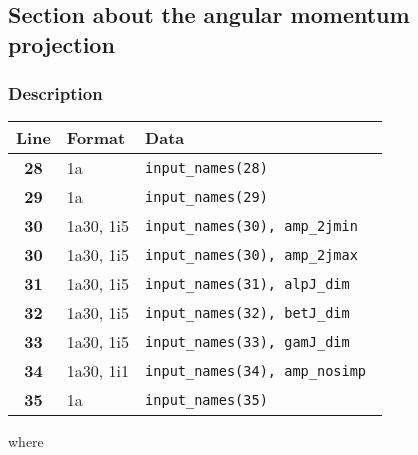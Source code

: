 \documentclass[a4paper,11pt]{article}
\begin{document}
%
%
\subsection{Section about the angular momentum projection}

\subsubsection*{Description}
\begin{center}
\begin{tabular}{|c|l|l|}
\hline
Line & Format & Data \\
\hline
 \textbf{28}   & 1a        & \tt input\_names(28)              \\
 \textbf{29}   & 1a        & \tt input\_names(29)              \\
 \textbf{30}   & 1a30, 1i5 & \tt input\_names(30), amp\_2jmin  \\
 \textbf{30}   & 1a30, 1i5 & \tt input\_names(30), amp\_2jmax  \\
 \textbf{31}   & 1a30, 1i5 & \tt input\_names(31), alpJ\_dim   \\
 \textbf{32}   & 1a30, 1i5 & \tt input\_names(32), betJ\_dim   \\
 \textbf{33}   & 1a30, 1i5 & \tt input\_names(33), gamJ\_dim   \\
 \textbf{34}   & 1a30, 1i1 & \tt input\_names(34), amp\_nosimp \\
 \textbf{35}   & 1a        & \tt input\_names(35)              \\
\hline
\end{tabular}
\end{center}
where
\end{document}

